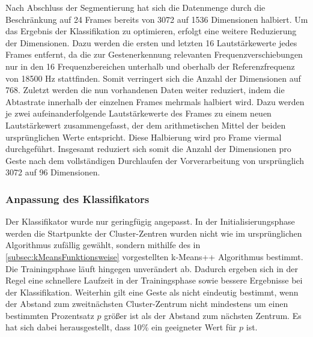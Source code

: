 Nach Abschluss der Segmentierung hat sich die Datenmenge durch die Beschränkung auf 24 Frames bereits von 3072 auf 1536 Dimensionen halbiert. Um das Ergebnis der Klassifikation zu optimieren, erfolgt eine weitere Reduzierung der Dimensionen. Dazu werden die ersten und letzten 16 Lautstärkewerte jedes Frames entfernt, da die zur Gestenerkennung relevanten Frequenzverschiebungen nur in den 16 Frequenzbereichen unterhalb und oberhalb der Referenzfrequenz von 18500 Hz stattfinden. Somit verringert sich die Anzahl der Dimensionen auf 768. Zuletzt werden die nun vorhandenen Daten weiter reduziert, indem die Abtastrate innerhalb der einzelnen Frames mehrmals halbiert wird. Dazu werden je zwei aufeinanderfolgende Lautstärkewerte des Frames zu einem neuen Lautstärkewert zusammengefasst, der dem arithmetischen Mittel der beiden ursprünglichen Werte entspricht. Diese Halbierung wird pro Frame viermal durchgeführt.
Insgesamt reduziert sich somit die Anzahl der Dimensionen pro Geste nach dem vollständigen Durchlaufen der Vorverarbeitung von ursprünglich 3072 auf 96 Dimensionen. 












\subsubsection{Anpassung des Klassifikators}

Der Klassifikator wurde nur geringfügig angepasst.
In der Initialisierungsphase werden die Startpunkte der Cluster-Zentren wurden nicht wie im ursprünglichen Algorithmus zufällig gewählt, sondern mithilfe des in \autoref{subsec:kMeansFunktionsweise} vorgestellten k-Means++ Algorithmus bestimmt. Die Trainingsphase läuft hingegen unverändert ab.
Dadurch ergeben sich in der Regel eine schnellere Laufzeit in der Trainingsphase sowie bessere Ergebnisse bei der Klassifikation.
Weiterhin gilt eine Geste als nicht eindeutig bestimmt, wenn der Abstand zum zweitnächsten Cluster-Zentrum nicht mindestens um einen bestimmten Prozentsatz $p$ größer ist als der Abstand zum nächsten Zentrum. Es hat sich dabei herausgestellt, dass 10\% ein geeigneter Wert für $p$ ist. %

